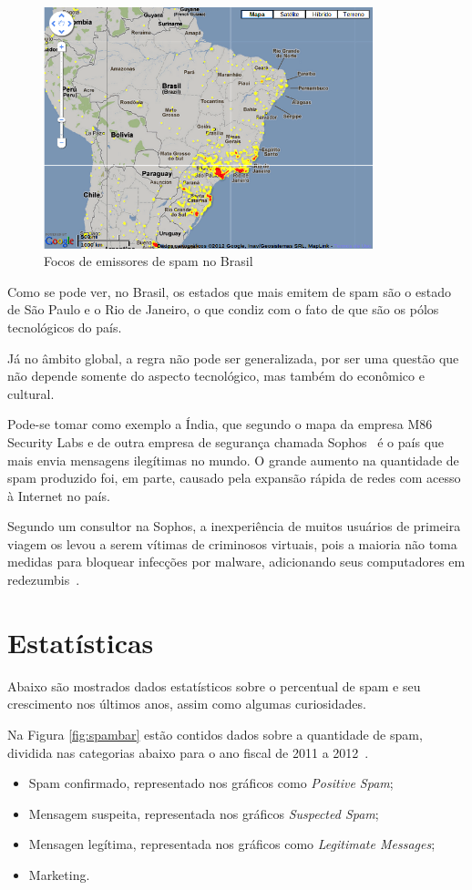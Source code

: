 \documentclass[a4paper,dvipdfm]{article}
\begin{document}
	\begin{figure}
		\centering
		\includegraphics[height=7cm]{Imagens/spam/brasilspam.png}
		\caption{Focos de emissores de spam no Brasil}
		\label{fig:spambrasil}
	\end{figure}
	
	Como se pode ver, no Brasil, os estados que mais emitem de spam são o estado de São Paulo e o Rio de Janeiro, o que condiz com o fato de que são os pólos tecnológicos do país.

	Já no âmbito global, a regra não pode ser generalizada, por ser uma questão que não depende somente do aspecto tecnológico, mas também do econômico e cultural.

	Pode-se tomar como exemplo a Índia, que segundo o mapa da empresa M86 Security Labs e de outra empresa de segurança chamada Sophos~\cite{sophos} é o país que mais envia mensagens ilegítimas no mundo.
	O grande aumento na quantidade de spam produzido foi, em parte, causado pela expansão rápida de redes com acesso à Internet no país.

	Segundo um consultor na Sophos, a inexperiência de muitos usuários de primeira viagem os levou a serem vítimas de criminosos virtuais, pois a maioria não toma medidas para bloquear infecções por \gls{malware}, adicionando seus computadores em \glspl{redezumbi}~\cite{spam:india}. 

\newpage
\section {Estatísticas}
	Abaixo são mostrados dados estatísticos sobre o percentual de spam e seu crescimento nos últimos anos, assim como algumas curiosidades.
	
	Na Figura \ref{fig:spambar} estão contidos dados sobre a quantidade de spam, dividida nas categorias abaixo para o ano fiscal de 2011 a 2012~\cite{spam:stats}.
	\begin{itemize}
		\item Spam confirmado, representado nos gráficos como \emph{Positive Spam};
		\item Mensagem suspeita, representada nos gráficos \emph{Suspected Spam};
		\item Mensagen legítima, representada nos gráficos como \emph{Legitimate Messages};
		\item Marketing.
	\end{itemize}
	
\end{document}
